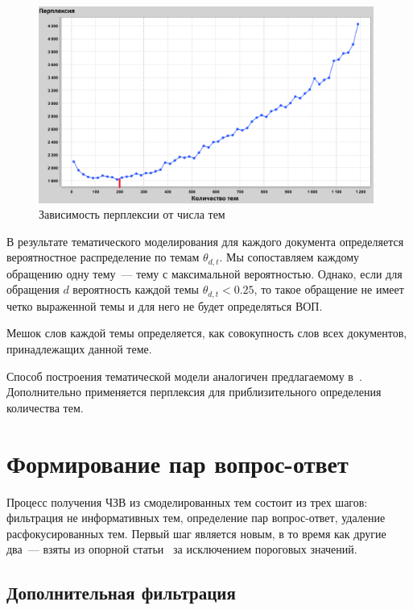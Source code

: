 \begin{figure}[tph!]
\centerline{\includegraphics[width=11cm]{fig/perpl.png}}
    \caption{Зависимость перплексии от числа тем}
    \label{fig:perpl}
\end{figure}

В результате тематического моделирования для каждого документа определяется вероятностное распределение по темам $\theta_{d,t}$. Мы сопоставляем каждому обращению одну тему~--- тему с максимальной вероятностью. Однако, если для обращения $d$ вероятность каждой темы $\theta_{d,t}<0.25$, то такое обращение не имеет четко выраженной темы и для него не будет определяться ВОП.

Мешок слов каждой темы определяется, как совокупность слов всех документов, принадлежащих данной теме.

Способ построения тематической модели аналогичен предлагаемому в~\cite{original}. Дополнительно применяется перплексия для приблизительного определения количества тем.

\section{Формирование пар вопрос-ответ}
\label{sec:qaforming}

Процесс получения ЧЗВ из смоделированных тем состоит из трех шагов: фильтрация не информативных тем, определение пар вопрос-ответ, удаление расфокусированных тем. Первый шаг является новым, в то время как другие два~--- взяты из опорной статьи~\cite{original} за исключением пороговых значений.

\subsection{Дополнительная фильтрация}
\label{subsec:topicfilter}

